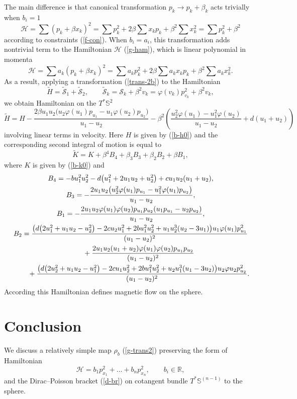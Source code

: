 \documentclass[10pt,a4paper]{amsart}
\numberwithin{equation}{section}
\begin{document}
The main difference is that canonical transformation $p_k\to p_k+\beta_k$ acts trivially when $b_i=1$
\[
\mathcal H=\sum (p_k+\beta x_k)^2=\sum p_k^2+2\beta\sum x_kp_k+\beta^2\sum x_k^2=\sum p_k^2+\beta^2
\]
according to constraints (\ref{f-con}). When $b_i=a_i$, this transformation adds nontrivial term to the Hamiltonian $\mathcal H$ (\ref{g-ham}), which is linear polynomial in momenta
\[
\mathcal H=\sum a_k (p_k+\beta x_k)^2=\sum a_k p_k^2+2\beta\sum a_kx_kp_k+\beta^2\sum a_kx_k^2 .
\]
As a result, applying a transformation (\ref{trans-2b}) to the Hamiltonian
\[
\tilde{H}=\tilde{\mathcal S}_1+\tilde{\mathcal{S}}_2 ,\qquad \tilde{\mathcal S}_k=\mathcal{S}_k+\beta^2 v_k=\varphi(v_k)p_{v_k}^2+\beta^2 v_k ,
\]
we obtain Hamiltonian on the $T^*\mathbb S^2$
\[
\tilde{H}=H-\frac{2\beta u_1u_2\big(u_2\varphi(u_1)p_{u_1} -u_1\varphi(u_2)p_{u_2}\big)}{u_1 - u_2}
-\beta^2\left(\frac{u_2^2\varphi(u_1)-u_1^2\varphi(u_2)}{u_1 - u_2} +d(u_1 + u_2)\right)
\]
involving linear terms in velocity. Here $H$ is given by (\ref{b-h0}) and the corresponding second integral of motion is equal to
\[
\tilde{K}=K+\beta^4 B_4+\beta_3B_3+\beta_2B_2+\beta B_1,
\]
where $K$ is given by (\ref{b-k0}) and
\begin{gather*}
B_4=-bu_1^2u_2^2 -d\big(u_1^2 + 2u_1u_2 + u_2^2\big) + cu_1u_2(u_1 + u_2) ,
\\
B_3=-\dfrac{2u_1u_2\big(u_2^2\varphi(u_1)p_{u_1} -u_1^2\varphi(u_1)p_{u_2}\big)}{u_1 - u_2} ,
\\
B_1=-\dfrac{2u_1u_2\varphi(u_1)\varphi(u_2)p_{u_1}p_{u_2}(u_1p_{u_1} - u_2p_{u_2})}{u_1 - u_2} ,
\\
B_2=
\frac{\big(d\big(2u_1^2 + u_1u_2 - u_2^2\big) - 2cu_2u_1^2 + 2bu_1^2u_2^2 + u_1u_2^3(u_2 - 3u_1)\big)u_1\varphi(u_1)p_{u_1}^2}{(u_1 - u_2)^2}\\
\hphantom{B_2=}{}
+\frac{2u_1u_2(u_1 + u_2)\varphi(u_1)\varphi(u_2)p_{u_1}p_{u_2}}{(u_1 - u_2)^2}\\
\hphantom{B_2=}{} +\frac{\big(d\big(2u_2^2+ u_1u_2 -u_1^2\big) - 2cu_1u_2^2 + 2bu_1^2u_2^2 + u_2u_1^3(u_1 - 3u_2)\big)u_2\varphi{u_2}p_{u_2}^2}{(u_1 - u_2)^2} .
\end{gather*}
According \cite{bm,dor,win00} this Hamiltonian defines magnetic flow on the sphere.

\section{Conclusion}
We discuss a relatively simple map $\rho_b$ (\ref{g-trans2}) preserving the form of Hamiltonian
\[
\mathcal H=b_1p_{x_1}^2+\dots +b_np_{x_n}^2 ,\qquad b_i\in\mathbb R ,
\]
and the Dirac--Poisson bracket (\ref{d-br}) on cotangent bundle $T^*\mathbb S^{(n-1)}$ to the sphere.
\end{document}
